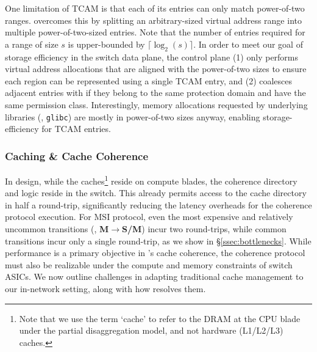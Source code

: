  One limitation of TCAM is that each of its entries can only match power-of-two ranges. \mind overcomes this by splitting an arbitrary-sized virtual address range into multiple power-of-two-sized entries. Note that the number of entries required for a range of size $s$ is upper-bounded by $\lceil\log_2(s)\rceil$. In order to meet our goal of storage efficiency in the switch data plane, the control plane (1) only performs virtual address allocations that are aligned with the power-of-two sizes to ensure each region can be represented using a single TCAM entry, and (2) coalesces adjacent entries with if they belong to the same protection domain and have the same permission class. Interestingly, memory allocations requested by underlying libraries (\eg, \texttt{glibc}) are mostly in power-of-two sizes anyway, enabling storage-efficiency for TCAM entries.

\subsubsection{Caching \& Cache Coherence}
\label{sssec:caching}

In \mind design, while the caches\footnote{Note that we use the term `cache' to refer to the DRAM at the CPU blade under the partial disaggregation model, and not hardware (L1/L2/L3) caches.} reside on compute blades, the coherence directory and logic reside in the switch. This already permits access to the cache directory in half a round-trip, significantly reducing the latency overheads for the coherence protocol execution. For MSI protocol, even the most expensive and relatively uncommon transitions (\ie, \textbf{M}$\rightarrow$\textbf{S/M}) incur two round-trips, while common transitions incur only a single round-trip, as we show in \S\ref{ssec:bottlenecks}. While performance is a primary objective in \mind's cache coherence, the coherence protocol must also be realizable under the compute and memory constraints of switch ASICs. We now outline challenges in adapting traditional cache management to our in-network setting, along with how \mind resolves them.

